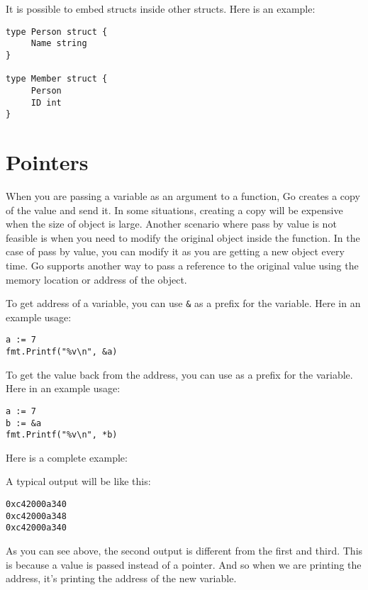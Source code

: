 It is possible to embed structs inside other
structs.  Here is an example:

\begin{lstlisting}[numbers=none]
type Person struct {
     Name string
}

type Member struct {
     Person
     ID int
}
\end{lstlisting}

\section{Pointers}

When you are passing a variable as an argument to a function, Go
creates a copy of the value and send it.  In some situations, creating
a copy will be expensive when the size of object is large.  Another
scenario where pass by value is not feasible is when you need to
modify the original object inside the function.  In the case of pass
by value, you can modify it as you are getting a new object every
time.  Go supports another way to pass a reference to the original
value using the memory location or address of the
object.

To get address of a variable, you can use \texttt{\&} as a prefix for
the variable.  Here in an example usage:

\begin{lstlisting}[numbers=none]
a := 7
fmt.Printf("%v\n", &a)
\end{lstlisting}

To get the value back from the address, you can use \texttt{\*} as a
prefix for the variable.  Here in an example usage:

\begin{lstlisting}[numbers=none]
a := 7
b := &a
fmt.Printf("%v\n", *b)
\end{lstlisting}

Here is a complete example:



A typical output will be like this:

\begin{lstlisting}[numbers=none]
0xc42000a340
0xc42000a348
0xc42000a340
\end{lstlisting}

As you can see above, the second output is different from the first
and third.  This is because a value is passed instead of a pointer.
And so when we are printing the address, it's printing the address of
the new variable.

